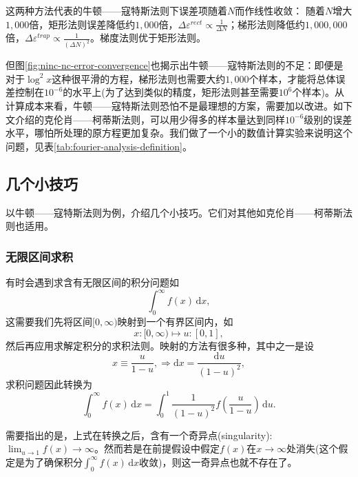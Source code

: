 这两种方法代表的牛顿——寇特斯法则下误差项随着$N$而作线性收敛：
随着$N$增大$1,000$倍，矩形法则误差降低约$1,000$倍，$\Delta \varepsilon^{rect} \propto \frac{1}{\Delta N}$；梯形法则降低约$1,000,000$倍，$\Delta \varepsilon^{trap} \propto \frac{1}{ \left(\Delta N \right)^{2}}$。梯度法则优于矩形法则。

但图\ref{fig:ninc-nc-error-convergence}也揭示出牛顿——寇特斯法则的不足：即便是对于$\log^{2} x$这种很平滑的方程，梯形法则也需要大约$1,000$个样本，才能将总体误差控制在$10^{-6}$的水平上(为了达到类似的精度，矩形法则甚至需要$10^{6}$个样本)。从计算成本来看，牛顿——寇特斯法则恐怕不是最理想的方案，需要加以改进。如下文介绍的克伦肖——柯蒂斯法则，可以用少得多的样本量达到同样$10^{-6}$级别的误差水平，哪怕所处理的原方程更加复杂。我们做了一个小的数值计算实验来说明这个问题，见表\ref{tab:fourier-analysis-definition}。

\subsection{几个小技巧}
\label{sec:ninc-tips}
以牛顿——寇特斯法则为例，介绍几个小技巧。它们对其他如克伦肖——柯蒂斯法则也适用。

\subsubsection{无限区间求积}
\label{sec:ninc-tips-improper-integral}
有时会遇到求含有无限区间的积分问题如
\begin{equation*}
  \int_{0}^{\infty} f(x) \, \mathrm{d} x,
\end{equation*}
这需要我们先将区间$[0, \infty)$映射到一个有界区间内，如
\begin{equation*}
  x:[0, \infty) \mapsto u:[0,1],
\end{equation*}
然后再应用求解定积分的求积法则。映射的方法有很多种，其中之一是设
\begin{equation*}
  x \equiv \frac{u}{1-u}, \Rightarrow \mathrm{d} x = \frac{\mathrm{d} u}{\left( 1 - u \right)^{2}},
\end{equation*}
求积问题因此转换为
\begin{equation*}
  \int_{0}^{\infty} f(x) \, \mathrm{d} x = \int_{0}^{1} \frac{1}{\left( 1 - u \right)^{2}} f
  \left( \frac{u}{1 - u} \right) \, \mathrm{d} u.
\end{equation*}

需要指出的是，上式在转换之后，含有一个奇异点(singularity):$\lim_{u \rightarrow 1} f(x) \rightarrow \infty$。然而若是在前提假设中假定$f(x)$在$x \rightarrow \infty$处消失(这个假定是为了确保积分$\int_{0}^{\infty} f(x) \, \mathrm{d} x$收敛)，则这一奇异点也就不存在了。

